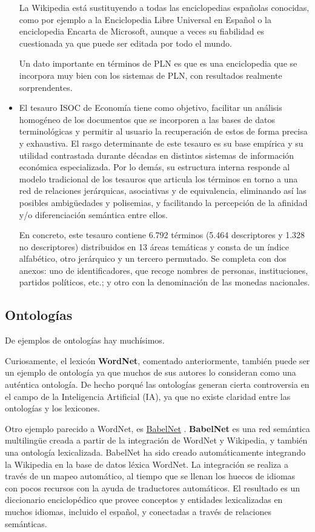 \documentclass[11pt]{exam}
\begin{document}
\begin{questions}
\begin{itemize}
	La Wikipedia está sustituyendo a todas las enciclopedias españolas conocidas, como por ejemplo a la Enciclopedia Libre Universal en Español o la enciclopedia Encarta de Microsoft, aunque a veces su fiabilidad es cuestionada ya que puede ser editada por todo el mundo.
	
	Un dato importante en términos de PLN es que es una enciclopedia que se incorpora muy bien con los sistemas de PLN, con resultados realmente sorprendentes.
	
	\item El tesauro ISOC de Economía tiene como objetivo, facilitar un análisis homogéneo de los documentos que se incorporen a las bases de datos terminológicas y permitir al usuario la recuperación de estos de forma precisa y exhaustiva. El rasgo determinante de este tesauro es su base empírica y su utilidad contrastada durante décadas en distintos sistemas de información económica especializada. Por lo demás, su estructura interna responde al modelo tradicional de los tesauros que articula los términos en torno a una red de relaciones jerárquicas, asociativas y de equivalencia, eliminando así las posibles ambigüedades y polisemias, y facilitando la percepción de la afinidad y/o diferenciación semántica entre ellos. 
	
	En concreto, este tesauro contiene 6.792 términos (5.464 descriptores y 1.328 no descriptores) distribuidos en 13 áreas temáticas y consta de un índice alfabético, otro jerárquico y un tercero permutado. Se completa con dos anexos: uno de identificadores, que recoge nombres de personas, instituciones, partidos políticos, etc.; y otro con la denominación de las monedas nacionales. 
	 
\end{itemize}

\subsection*{Ontologías}

De ejemplos de ontologías hay muchísimos.

Curiosamente, el lexicón {\bf WordNet}, comentado anteriormente, también puede ser un ejemplo de ontología ya que muchos de sus autores lo consideran como una auténtica ontología. De hecho porqué las ontologías generan cierta controversia en el campo de la Inteligencia Artificial (IA), ya que no existe claridad entre las ontologías y los lexicones.

Otro ejemplo parecido a WordNet, es \href{https://babelnet.org/}{BabelNet} . {\bf BabelNet} es una red semántica multilingüe creada a partir de la integración de WordNet y Wikipedia, y también una ontología lexicalizada. BabelNet ha sido creado automáticamente integrando la Wikipedia en la base de datos léxica WordNet. La integración se realiza a través de un mapeo automático, al tiempo que se llenan los huecos de idiomas con pocos recursos con la ayuda de traductores automáticos. El resultado es un diccionario enciclopédico que provee conceptos y entidades lexicalizadas en muchos idiomas, incluido el español, y conectadas a través de relaciones semánticas. 


\end{questions}
\end{document}
